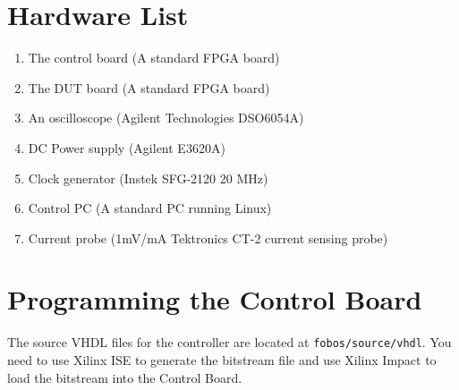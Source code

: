 \section{Hardware List}
\begin{enumerate}
  \item The control board (A standard FPGA board)
  \item The DUT board (A standard FPGA board)
  \item An oscilloscope (Agilent Technologies DSO6054A) 
  \item DC Power supply (Agilent E3620A)
  \item Clock generator (Instek SFG-2120 20 MHz)
  \item Control PC (A standard PC running Linux)
  \item Current probe (1mV/mA Tektronics CT-2 current sensing probe)
\end{enumerate}


\section{Programming the Control Board}

The source VHDL files for the controller are located at \texttt{fobos/source/vhdl}. You need to use Xilinx ISE to generate the bitstream file and use Xilinx Impact to load the bitstream
into the Control Board.

